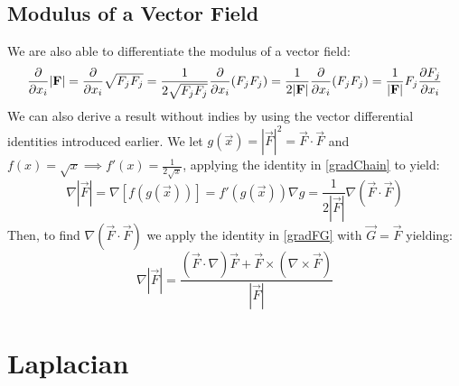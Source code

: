 \documentclass[../main.tex]{subfiles}
\begin{document}
\subsection{Modulus of a Vector Field}
We are also able to differentiate the modulus of a vector field:
\[
  \pderiv{}{x_i}|\vec{F}| = \pderiv{}{x_i}\sqrt{F_jF_j} = \frac{1}{2\sqrt{F_j F_j}} \pderiv{}{x_i}(F_jF_j) = \frac{1}{2|\vec{F}|} \pderiv{}{x_i}(F_jF_j) = \frac{1}{|\vec{F}|} F_j \pderiv{F_j}{x_i}
\]
We can also derive a result without indies by using the vector differential identities introduced earlier.
We let $g(\vec{x}) = |\vec{F}|^2 = \vec{F} \cdot \vec{F}$ and $f(x) = \sqrt{x} \implies f'(x) = \frac{1}{2\sqrt{x}}$, applying the identity in \cref{gradChain} to yield:
\[
  \nabla |\vec{F}| = \nabla [f(g(\vec{x}))] = f'(g(\vec{x})) \nabla g = \frac{1}{2|\vec{F}|} \nabla (\vec{F} \cdot \vec{F})
\]
Then, to find $\nabla(\vec{F} \cdot \vec{F})$ we apply the identity in \cref{gradFG} with $\vec{G} = \vec{F}$ yielding:
\[
  \nabla |\vec{F}| = \frac{(\vec{F} \cdot \nabla) \vec{F} + \vec{F} \times (\nabla \times \vec{F})}{|\vec{F}|}
\]
\section{Laplacian}
\label{secLaplacian}
\end{document}
